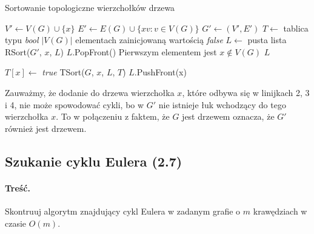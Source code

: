\begin{algorithm}[H]
	\caption{Sortowanie topologiczne wierzchołków drzewa}
	\begin{algorithmic}[1]
		\State $V' \gets V(G) \cup \{x\}$
		\State $E' \gets E(G) \cup \{xv : v \in V(G)\}$
		\State $G' \gets (V', E')$
		\State $T \gets$ tablica typu \textit{bool} $|V(G)|$ elementach zainicjowaną wartością 
		\textit{false}
		\State $L \gets$ pusta lista
		\State RSort($G'$, $x$, $L$)
		\State $L$.PopFront() \Comment Pierwszym elementem jest $x \not \in V(G)$
		\State \Return $L$
		\EndProcedure
		
		\State $T[x] \gets$ \textit{true}
		\State TSort($G$, $x$, $L$, $T$)
		\EndIf
		\EndWhile
		\State $L$.PushFront(x)
		\EndProcedure
	\end{algorithmic}
	\label{alg:Zadanie26}
\end{algorithm}

Zauważmy, że dodanie do drzewa wierzchołka $x$, które odbywa się w linijkach 2, 3 i 4, nie może spowodować
cykli, bo w $G'$ nie istnieje łuk wchodzący do tego wierzchołka $x$. To w połączeniu z faktem, 
że $G$ jest drzewem oznacza, że $G'$ również jest drzewem.

\subsection{Szukanie cyklu Eulera (2.7)}
\paragraph{Treść.} Skontruuj algorytm znajdujący cykl Eulera 
w zadanym grafie o $m$ krawędziach w czasie $O(m)$.

